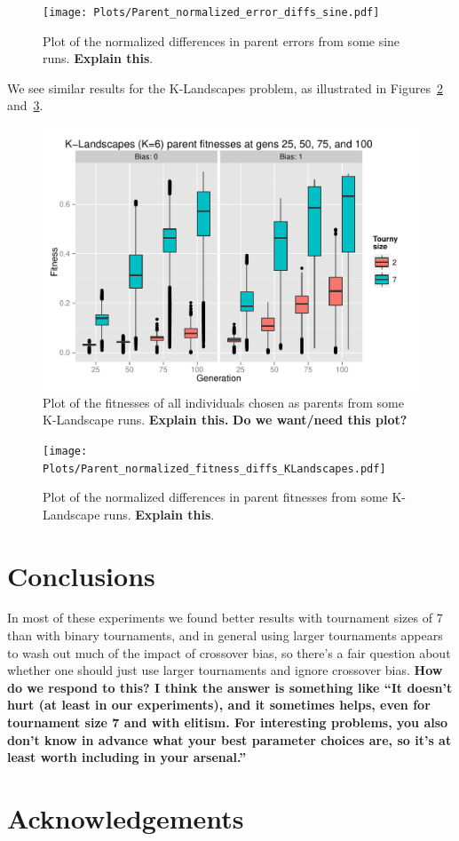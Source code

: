 \documentclass{sig-alternate}
\begin{document}
\begin{figure}
\centering
\texttt{[image: Plots/Parent\_normalized\_error\_diffs\_sine.pdf]}
\caption{Plot of the normalized differences in parent errors from some sine runs. \textbf{Explain this}.}
\label{fig:parentDiffsSine}
\end{figure}

We see similar results for the K-Landscapes problem, as illustrated in Figures~\ref{fig:parentFitnessesKLandscapes} and~\ref{fig:parentDiffsKLandscapes}.

\begin{figure}
\centering
\includegraphics[width=0.45 \textwidth]{Plots/Parent_fitnesses_KLandscapes.pdf}
\caption{Plot of the fitnesses of all individuals chosen as parents from some K-Landscape runs. \textbf{Explain this.} \textbf{Do we want/need this plot?}}
\label{fig:parentFitnessesKLandscapes}
\end{figure}

\begin{figure}
\centering
\texttt{[image: Plots/Parent\_normalized\_fitness\_diffs\_KLandscapes.pdf]}
\caption{Plot of the normalized differences in parent fitnesses from some K-Landscape runs. \textbf{Explain this}.}
\label{fig:parentDiffsKLandscapes}
\end{figure}

\section{Conclusions} \label{sec:Conclusions}

In most of these experiments we found better results with tournament sizes of 7 than with binary tournaments, and in 
general using larger tournaments appears to wash out much of the impact of crossover bias, so there's a fair question 
about whether one should just use larger tournaments and ignore crossover bias. \textbf{How do we respond to this? I 
think the answer is something like ``It doesn't hurt (at least in our experiments), and it sometimes helps, even for 
tournament size 7 and with elitism. For interesting problems, you also don't know in advance what your best parameter 
choices are, so it's at least worth including in your arsenal.''}

\section*{Acknowledgements}



\end{document}
